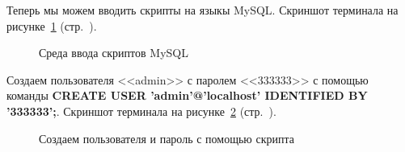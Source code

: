 Теперь мы можем вводить скрипты на языкы MySQL.
Скриншот терминала на рисунке~\ref{fig:make-phpmyadmin-superuser-step-1} (стр.~\pageref{fig:make-phpmyadmin-superuser-step-1}).

\begin{figure}[p]
    \caption{Среда ввода скриптов MySQL}
    \label{fig:make-phpmyadmin-superuser-step-1}
\end{figure}

Создаем пользователя <<admin>> с паролем <<333333>> с помощью команды \textbf{CREATE USER 'admin'@'localhost' IDENTIFIED BY '333333';}.
Скриншот терминала на рисунке~\ref{fig:make-phpmyadmin-superuser-step-2} (стр.~\pageref{fig:make-phpmyadmin-superuser-step-2}).

\begin{figure}[p]
    \caption{Создаем пользователя и пароль с помощью скрипта}
    \label{fig:make-phpmyadmin-superuser-step-2}
\end{figure}


